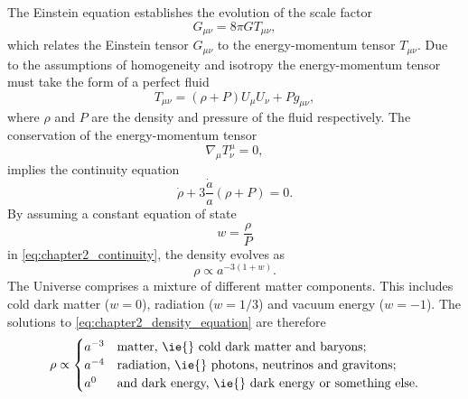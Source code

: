 The Einstein equation establishes the evolution of the scale factor
%
\begin{equation}\label{eq:chapter2_einstein_tensor}
	G_{\mu\nu}
	= 8\pi G T_{\mu\nu},
\end{equation}
%
which relates the Einstein tensor \(G_{\mu\nu}\) to the energy-momentum tensor \(T_{\mu\nu}\).
Due to the assumptions of homogeneity and isotropy the energy-momentum tensor must take the form of a perfect fluid
%
\begin{equation}\label{eq:chapter2_energy_momentum}
	T_{\mu\nu}
	= (\rho + P) U_{\mu} U_{\nu} + P g_{\mu\nu},
\end{equation}
%
where \(\rho{}\) and \(P\) are the density and pressure of the fluid respectively.
The conservation of the energy-momentum tensor
%
\begin{equation}
	\nabla_{\mu} T^{\mu}_{\nu}
	= 0,
\end{equation}
%
implies the continuity equation
%
\begin{equation}\label{eq:chapter2_continuity}
	\dot{\rho} + 3\frac{\dot{a}}{a}(\rho + P)
	= 0.
\end{equation}
%
By assuming a constant equation of state
%
\begin{equation}
	w
	= \frac{\rho}{P}
\end{equation}
%
in \cref{eq:chapter2_continuity}, the density evolves as
%
\begin{equation}\label{eq:chapter2_density_equation}
	\rho
	\propto a^{-3(1+w)}.
\end{equation}
%
The Universe comprises a mixture of different matter components.
This includes cold dark matter (\(w=0\)), radiation (\(w=1/3\)) and vacuum energy (\(w=-1\)).
The solutions to \cref{eq:chapter2_density_equation} are therefore
%
\begin{equation}
	\rho \propto
	\begin{cases}
		a^{-3} & \text{matter, \ie{} cold dark matter and baryons};           \\
		a^{-4} & \text{radiation, \ie{} photons, neutrinos and gravitons};    \\
		a^{0}  & \text{and dark energy, \ie{} dark energy or something else}.
	\end{cases}
\end{equation}

